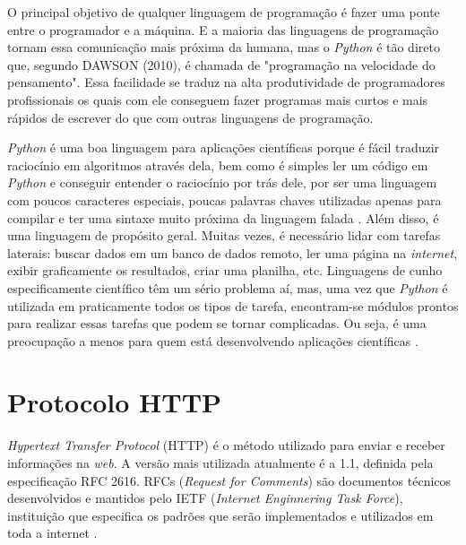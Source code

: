 O principal objetivo de qualquer linguagem de programação é fazer uma ponte entre o programador e a máquina. E a maioria das linguagens de programação tornam essa comunicação mais próxima da humana, mas o \textit{Python} é tão direto que, segundo DAWSON (2010), é chamada de "programação na velocidade do pensamento". Essa facilidade se traduz na alta produtividade de programadores profissionais os quais com ele conseguem fazer programas mais curtos e mais rápidos de escrever do que com outras linguagens de programação. 

\textit{Python} é uma boa linguagem para aplicações científicas porque é fácil traduzir raciocínio em algoritmos através dela, bem como é simples ler um código em \textit{Python} e conseguir entender o raciocínio por trás dele, por ser uma linguagem com poucos caracteres especiais, poucas palavras chaves utilizadas apenas para compilar e ter uma sintaxe muito próxima da linguagem falada \cite{reitz2018}. Além disso, é uma linguagem de propósito geral. Muitas vezes, é necessário lidar com tarefas laterais: buscar dados em um banco de dados remoto, ler uma página na \textit{internet}, exibir graficamente os resultados, criar uma planilha, etc. Linguagens de cunho especificamente científico têm um sério problema aí, mas, uma vez que \textit{Python} é utilizada em praticamente todos os tipos de tarefa, encontram-se módulos prontos para realizar essas tarefas que podem se tornar complicadas. Ou seja, é uma preocupação a menos para quem está desenvolvendo aplicações científicas \cite{downey2012}.
  

\section{Protocolo HTTP}

\textit{Hypertext Transfer Protocol} (HTTP)  é o método utilizado para enviar e receber informações na \textit{web}.  A versão mais utilizada atualmente é a 1.1, definida pela especificação RFC 2616. RFCs (\textit{Request for Comments}) são documentos técnicos desenvolvidos e mantidos pelo IETF (\textit{Internet Enginnering Task Force}), instituição que especifica os padrões que serão implementados e utilizados em toda a internet \cite{vieira2007}.

